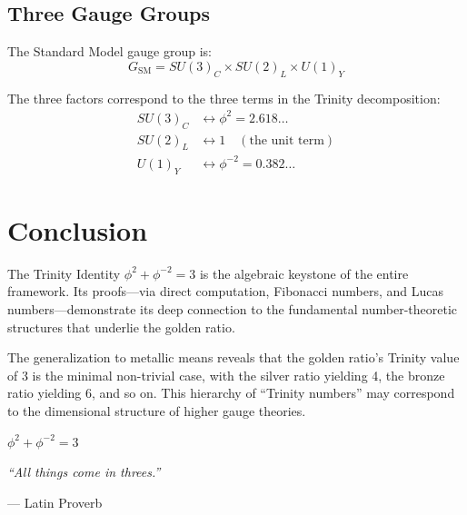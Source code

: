 \subsection{Three Gauge Groups}

The Standard Model gauge group is:
\begin{equation}
    G_{\text{SM}} = SU(3)_C \times SU(2)_L \times U(1)_Y
\end{equation}

The three factors correspond to the three terms in the Trinity decomposition:
\begin{align}
    SU(3)_C &\leftrightarrow \phi^2 = 2.618\ldots \\
    SU(2)_L &\leftrightarrow 1 \quad (\text{the unit term}) \\
    U(1)_Y &\leftrightarrow \phi^{-2} = 0.382\ldots
\end{align}

\section{Conclusion}

The Trinity Identity $\phi^2 + \phi^{-2} = 3$ is the algebraic keystone of the entire framework. Its proofs—via direct computation, Fibonacci numbers, and Lucas numbers—demonstrate its deep connection to the fundamental number-theoretic structures that underlie the golden ratio.

The generalization to metallic means reveals that the golden ratio's Trinity value of 3 is the minimal non-trivial case, with the silver ratio yielding 4, the bronze ratio yielding 6, and so on. This hierarchy of ``Trinity numbers'' may correspond to the dimensional structure of higher gauge theories.

\begin{center}
    \Large $\phi^2 + \phi^{-2} = 3$
\end{center}

\begin{flushright}
    \textit{``All things come in threes.''}
    \par\hfill — Latin Proverb
\end{flushright}
